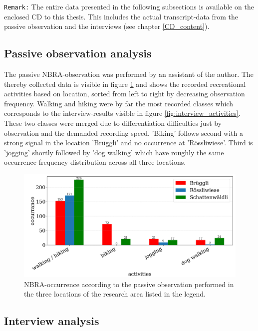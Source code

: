 \texttt{Remark:} The entire data presented in the following subsections is available on the enclosed CD to this thesis. This includes the actual transcript-data from the passive observation and the interviews (see chapter \ref{CD_content}).

\subsection{Passive observation analysis}
The passive NBRA-observation was performed by an assistant of the author. The thereby collected data is visible in figure \ref{fig:passive_observation} and shows the recorded recreational activities based on location, sorted from left to right by decreasing observation frequency. Walking and hiking were by far the most recorded classes which corresponds to the interview-results visible in figure \ref{fig:interview_activities}. These two classes were merged due to differentiation difficulties just by observation and the demanded recording speed. 'Biking' follows second with a strong signal in the location 'Br\"uggli' and no occurrence at 'R\"ossliwiese'. Third is 'jogging' shortly followed by 'dog walking' which have roughly the same occurrence frequency distribution across all three locations.

\begin{figure}[h!]
   \centering
   \includegraphics[width=\textwidth]{img/passive_observations.pdf}
   \caption{NBRA-occurrence according to the passive observation performed in the three locations of the research area listed in the legend.}
   \label{fig:passive_observation}
\end{figure}

\subsection{Interview analysis}

